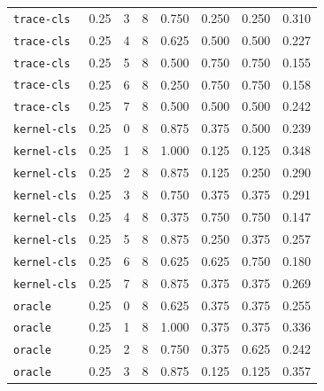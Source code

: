 \documentclass{article}
\begin{document}
\begin{center}
{\begin{tabular}{llllcccc}
\texttt{trace-cls} & 0.25 & 3 & 8 & 0.750 & 0.250 & 0.250 & 0.310 \\
\texttt{trace-cls} & 0.25 & 4 & 8 & 0.625 & 0.500 & 0.500 & 0.227 \\
\texttt{trace-cls} & 0.25 & 5 & 8 & 0.500 & 0.750 & 0.750 & 0.155 \\
\texttt{trace-cls} & 0.25 & 6 & 8 & 0.250 & 0.750 & 0.750 & 0.158 \\
\texttt{trace-cls} & 0.25 & 7 & 8 & 0.500 & 0.500 & 0.500 & 0.242 \\
\texttt{kernel-cls} & 0.25 & 0 & 8 & 0.875 & 0.375 & 0.500 & 0.239 \\
\texttt{kernel-cls} & 0.25 & 1 & 8 & 1.000 & 0.125 & 0.125 & 0.348 \\
\texttt{kernel-cls} & 0.25 & 2 & 8 & 0.875 & 0.125 & 0.250 & 0.290 \\
\texttt{kernel-cls} & 0.25 & 3 & 8 & 0.750 & 0.375 & 0.375 & 0.291 \\
\texttt{kernel-cls} & 0.25 & 4 & 8 & 0.375 & 0.750 & 0.750 & 0.147 \\
\texttt{kernel-cls} & 0.25 & 5 & 8 & 0.875 & 0.250 & 0.375 & 0.257 \\
\texttt{kernel-cls} & 0.25 & 6 & 8 & 0.625 & 0.625 & 0.750 & 0.180 \\
\texttt{kernel-cls} & 0.25 & 7 & 8 & 0.875 & 0.375 & 0.375 & 0.269 \\
\texttt{oracle} & 0.25 & 0 & 8 & 0.625 & 0.375 & 0.375 & 0.255 \\
\texttt{oracle} & 0.25 & 1 & 8 & 1.000 & 0.375 & 0.375 & 0.336 \\
\texttt{oracle} & 0.25 & 2 & 8 & 0.750 & 0.375 & 0.625 & 0.242 \\
\texttt{oracle} & 0.25 & 3 & 8 & 0.875 & 0.125 & 0.125 & 0.357 \\
\bottomrule
\end{tabular}%
}
\end{center}
\end{document}
